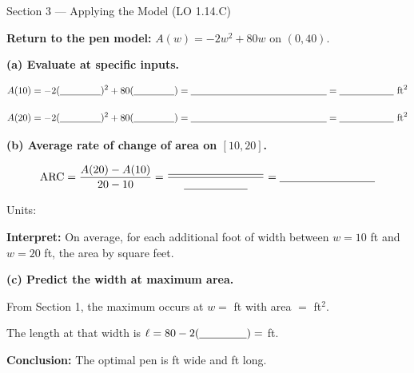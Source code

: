 \documentclass[10pt]{article}
\begin{document}
\begin{notesbox}{Section 3 --- Applying the Model (LO 1.14.C)}

\textbf{Return to the pen model:} $A(w) = -2w^2 + 80w$ on $(0, 40)$.

\medskip
\textbf{(a) Evaluate at specific inputs.}

\[
  A(10) = -2(\blank{1.5cm})^2 + 80(\blank{1.5cm}) = \blank{5cm} = \blank{2cm} \text{ ft}^2
\]

\[
  A(20) = -2(\blank{1.5cm})^2 + 80(\blank{1.5cm}) = \blank{5cm} = \blank{2cm} \text{ ft}^2
\]

\medskip
\textbf{(b) Average rate of change of area on $[10, 20]$.}

\[
  \text{ARC} = \dfrac{A(20) - A(10)}{20 - 10} = \dfrac{\blank{3cm}}{\blank{2cm}} = \blank{3cm}
\]

Units: \blank{5cm}

\medskip
\textbf{Interpret:} On average, for each additional foot of width between $w = 10$ ft and $w = 20$ ft,
the area \blank{3cm} by \blank{3cm} square feet.

\medskip
\textbf{(c) Predict the width at maximum area.}

From Section 1, the maximum occurs at $w = $ \blank{2cm} ft with area $= $ \blank{3cm} ft$^2$.

The length at that width is $\ell = 80 - 2(\blank{1.5cm}) = $ \blank{3cm} ft.

\medskip
\textbf{Conclusion:} The optimal pen is \blank{2cm} ft wide and \blank{3cm} ft long.

\end{notesbox}
\end{document}
